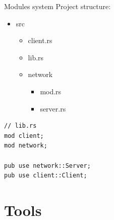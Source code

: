 \documentclass{beamer}
\begin{document}
    \begin{frame}[fragile]{Modules system}
        Project structure:

        \large{
            \begin{itemize}
                \item src
                \begin{itemize}
                    \item client.rs
                    \item lib.rs
                    \item network
                    \begin{itemize}
                        \item mod.rs
                        \item server.rs
                    \end{itemize}
                \end{itemize}
            \end{itemize}
        }
        \large\begin{verbatim}
// lib.rs
mod client;
mod network;

pub use network::Server;
pub use client::Client;
        \end{verbatim}
    \end{frame}

\section{Tools}
\end{document}
